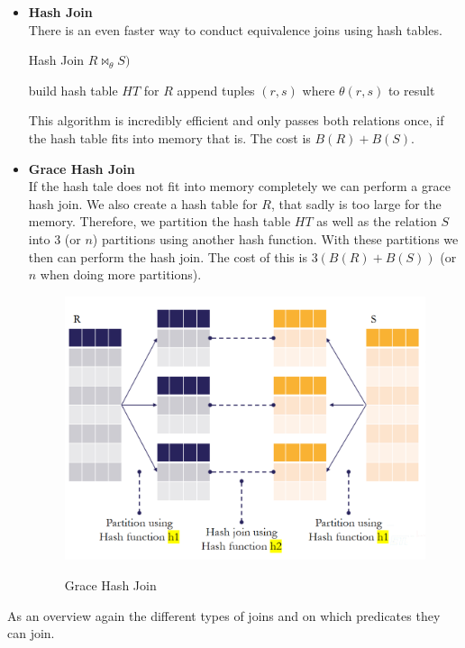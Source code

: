 \begin{itemize}
\item \textbf{Hash Join}\\
There is an even faster way to conduct equivalence joins using hash tables.
\begin{algorithm}[H]
\caption{Hash Join $R \Join_\theta S)$}
\begin{algorithmic}
\State build hash table $HT$ for $R$
		\State append tuples $(r, s)$ where $\theta(r, s)$ to result
	\EndIf
\EndFor
\end{algorithmic}
\end{algorithm}
This algorithm is incredibly efficient and only passes both relations once, if the hash table fits into memory that is. The cost is $B(R) + B(S)$.
\item \textbf{Grace Hash Join}\\
If the hash tale does not fit into memory completely we can perform a grace hash join. We also create a hash table for $R$, that sadly is too large for the memory. Therefore, we partition the hash table $HT$ as well as the relation $S$ into 3 (or $n$) partitions using another hash function. With these partitions we then can perform the hash join. The cost of this is $3(B(R) + B(S))$ (or $n$ when doing more partitions).
\begin{figure}[H]
\centering
\includegraphics[width=.6\textwidth]{images/grace_join.PNG}
\label{grace_join}
\caption{Grace Hash Join}
\end{figure}
\end{itemize}
As an overview again the different types of joins and on which predicates they can join.
